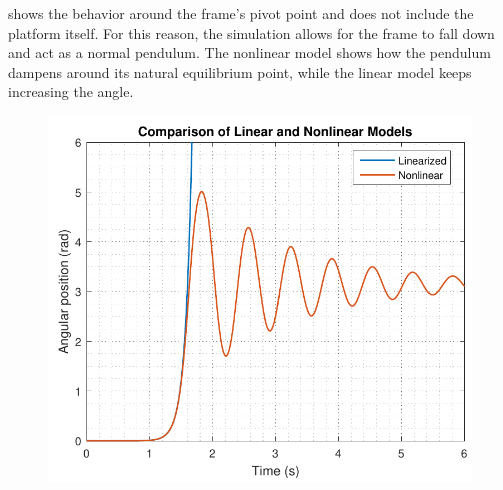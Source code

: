  shows the behavior around the frame's pivot point and does not include the platform itself. For this reason, the simulation allows for the frame to fall down and act as a normal pendulum. The nonlinear model shows how the pendulum dampens around its natural equilibrium point, while the linear model keeps increasing the angle.
%
\begin{figure}[H]
   \includegraphics[scale=.55]{figures/LinearizedVSNonlinear}
	\centering
	\captionsetup{justification=centering}
  	\label{LinearizedVSNonlinear}
\end{figure}\vspace{-18pt}
%
\newpage
